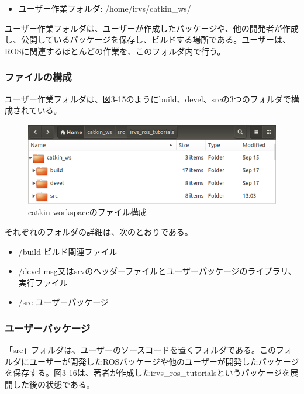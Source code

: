 \begin{itemize}
\item ユーザー作業フォルダ: /home/irvs/catkin\_ws/
\end{itemize}

ユーザー作業フォルダは、ユーザーが作成したパッケージや、他の開発者が作成し、公開しているパッケージを保存し、ビルドする場所である。ユーザーは、ROSに関連するほとんどの作業を、このフォルダ内で行う。

\subsubsection{ファイルの構成}
ユーザー作業フォルダは、図3-15のようにbuild、devel、srcの3つのフォルダで構成されている。

\begin{figure}[h]
  \centering
  \includegraphics[width=12cm]{pictures/chapter3/pic_03_15.png}
  \caption{catkin workspaceのファイル構成}
\end{figure}

それぞれのフォルダの詳細は、次のとおりである。

\begin{itemize}
\item /build  ビルド関連ファイル
\item /devel  msg又はsrvのヘッダーファイルとユーザーパッケージのライブラリ、実行ファイル
\item /src    ユーザーパッケージ
\end{itemize}

\subsubsection{ユーザーパッケージ}
「src」フォルダは、ユーザーのソースコードを置くフォルダである。このフォルダにユーザーが開発したROSパッケージや他のユーザーが開発したパッケージを保存する。図3-16は、著者が作成したirvs\_ros\_tutorialsというパッケージを展開した後の状態である。

